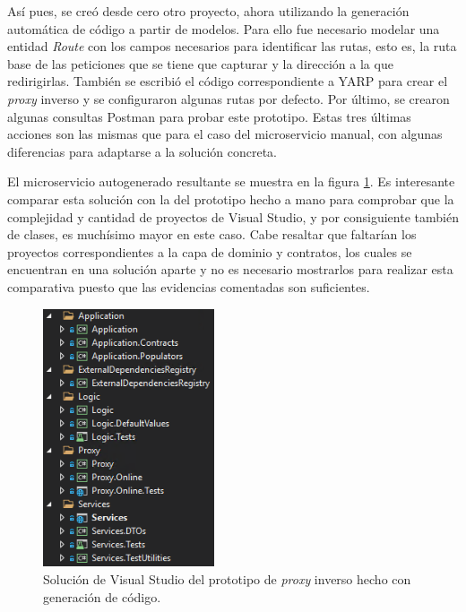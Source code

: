 \documentclass[11pt,spanish,listoffigures]{tfgetsinf}
\begin{document}
Así pues, se creó desde cero otro proyecto, ahora utilizando la generación automática de código a partir de modelos. Para ello fue necesario modelar una entidad \emph{Route} con los campos necesarios para identificar las rutas, esto es, la ruta base de las peticiones que se tiene que capturar y la dirección a la que redirigirlas. También se escribió el código correspondiente a YARP para crear el \emph{proxy} inverso y se configuraron algunas rutas por defecto. Por último, se crearon algunas consultas Postman para probar este prototipo. Estas tres últimas acciones son las mismas que para el caso del microservicio manual, con algunas diferencias para adaptarse a la solución concreta.

El microservicio autogenerado resultante se muestra en la figura \ref{prototipoAutogenerado}. Es interesante comparar esta solución con la del prototipo hecho a mano para comprobar que la complejidad y cantidad de proyectos de Visual Studio, y por consiguiente también de clases, es muchísimo mayor en este caso. Cabe resaltar que faltarían los proyectos correspondientes a la capa de dominio y contratos, los cuales se encuentran en una solución aparte y no es necesario mostrarlos para realizar esta comparativa puesto que las evidencias comentadas son suficientes.

\begin{figure}[ht]
\centering
\includegraphics[width=0.45\textwidth]{imagenes/prototipoAutogenerado}
\caption{Solución de Visual Studio del prototipo de \emph{proxy} inverso hecho con generación de código.}
	\label{prototipoAutogenerado}
\end{figure}

\end{document}
